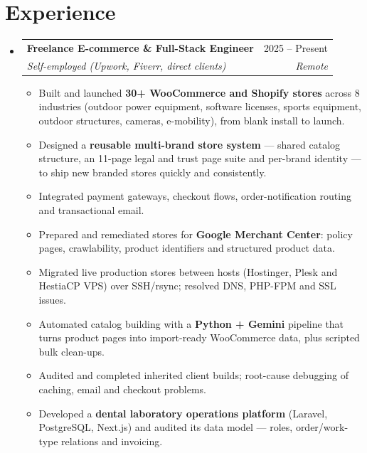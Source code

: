 \documentclass[letterpaper,10.5pt]{article}
\makeatletter
\newcommand{\entry}[4]{%
  \item\begin{tabular*}{\linewidth}{l@{\extracolsep{\fill}}r}
    \textbf{#1} & #2 \\ \textit{\small #3} & \textit{\small #4}\\
  \end{tabular*}\vspace{-6pt}}
\newcommand{\pt}[1]{\item\small{#1\vspace{-1.5pt}}}
\newenvironment{entries}{\begin{itemize}[leftmargin=0.12in,label={}]}{\end{itemize}}
\newenvironment{points}{\begin{itemize}[leftmargin=0.2in,itemsep=0pt,topsep=3pt,label=\textbullet]}{\end{itemize}\vspace{-3pt}}
\makeatother
\begin{document}
\section{Experience}
\begin{entries}
  \entry{Freelance E-commerce \& Full-Stack Engineer}{2025 -- Present}{Self-employed (Upwork, Fiverr, direct clients)}{Remote}
  \begin{points}
    \pt{Built and launched \textbf{30+ WooCommerce and Shopify stores} across 8 industries (outdoor power equipment, software licenses, sports equipment, outdoor structures, cameras, e-mobility), from blank install to launch.}
    \pt{Designed a \textbf{reusable multi-brand store system} --- shared catalog structure, an 11-page legal and trust page suite and per-brand identity --- to ship new branded stores quickly and consistently.}
    \pt{Integrated payment gateways, checkout flows, order-notification routing and transactional email.}
    \pt{Prepared and remediated stores for \textbf{Google Merchant Center}: policy pages, crawlability, product identifiers and structured product data.}
    \pt{Migrated live production stores between hosts (Hostinger, Plesk and HestiaCP VPS) over SSH/rsync; resolved DNS, PHP-FPM and SSL issues.}
    \pt{Automated catalog building with a \textbf{Python + Gemini} pipeline that turns product pages into import-ready WooCommerce data, plus scripted bulk clean-ups.}
    \pt{Audited and completed inherited client builds; root-cause debugging of caching, email and checkout problems.}
    \pt{Developed a \textbf{dental laboratory operations platform} (Laravel, PostgreSQL, Next.js) and audited its data model --- roles, order/work-type relations and invoicing.}
  \end{points}
\end{entries}

\end{document}
